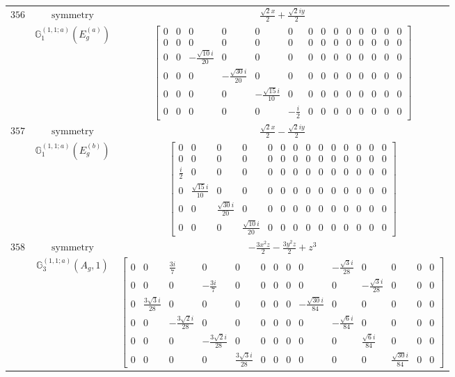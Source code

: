 \documentclass[fleqn,8pt,landscape]{jsarticle}
\begin{document}
\begin{longtable}{ccc}
$ 356 $ & $ \text{symmetry} $ & $ \frac{\sqrt{2} x}{2} + \frac{\sqrt{2} i y}{2} $ \\
$  $ & $ \mathbb{G}_{1}^{(1,1;a)}(E_{g}^{(a)}) $ & $ \begin{bmatrix} 0 & 0 & 0 & 0 & 0 & 0 & 0 & 0 & 0 & 0 & 0 & 0 & 0 & 0 \\ 0 & 0 & 0 & 0 & 0 & 0 & 0 & 0 & 0 & 0 & 0 & 0 & 0 & 0 \\ 0 & 0 & - \frac{\sqrt{10} i}{20} & 0 & 0 & 0 & 0 & 0 & 0 & 0 & 0 & 0 & 0 & 0 \\ 0 & 0 & 0 & - \frac{\sqrt{30} i}{20} & 0 & 0 & 0 & 0 & 0 & 0 & 0 & 0 & 0 & 0 \\ 0 & 0 & 0 & 0 & - \frac{\sqrt{15} i}{10} & 0 & 0 & 0 & 0 & 0 & 0 & 0 & 0 & 0 \\ 0 & 0 & 0 & 0 & 0 & - \frac{i}{2} & 0 & 0 & 0 & 0 & 0 & 0 & 0 & 0 \end{bmatrix} $ \\ \hline
$ 357 $ & $ \text{symmetry} $ & $ \frac{\sqrt{2} x}{2} - \frac{\sqrt{2} i y}{2} $ \\
$  $ & $ \mathbb{G}_{1}^{(1,1;a)}(E_{g}^{(b)}) $ & $ \begin{bmatrix} 0 & 0 & 0 & 0 & 0 & 0 & 0 & 0 & 0 & 0 & 0 & 0 & 0 & 0 \\ 0 & 0 & 0 & 0 & 0 & 0 & 0 & 0 & 0 & 0 & 0 & 0 & 0 & 0 \\ \frac{i}{2} & 0 & 0 & 0 & 0 & 0 & 0 & 0 & 0 & 0 & 0 & 0 & 0 & 0 \\ 0 & \frac{\sqrt{15} i}{10} & 0 & 0 & 0 & 0 & 0 & 0 & 0 & 0 & 0 & 0 & 0 & 0 \\ 0 & 0 & \frac{\sqrt{30} i}{20} & 0 & 0 & 0 & 0 & 0 & 0 & 0 & 0 & 0 & 0 & 0 \\ 0 & 0 & 0 & \frac{\sqrt{10} i}{20} & 0 & 0 & 0 & 0 & 0 & 0 & 0 & 0 & 0 & 0 \end{bmatrix} $ \\ \hline
$ 358 $ & $ \text{symmetry} $ & $ - \frac{3 x^{2} z}{2} - \frac{3 y^{2} z}{2} + z^{3} $ \\
$  $ & $ \mathbb{G}_{3}^{(1,1;a)}(A_{g},1) $ & $ \begin{bmatrix} 0 & 0 & \frac{3 i}{7} & 0 & 0 & 0 & 0 & 0 & 0 & - \frac{\sqrt{3} i}{28} & 0 & 0 & 0 & 0 \\ 0 & 0 & 0 & - \frac{3 i}{7} & 0 & 0 & 0 & 0 & 0 & 0 & - \frac{\sqrt{3} i}{28} & 0 & 0 & 0 \\ 0 & \frac{3 \sqrt{3} i}{28} & 0 & 0 & 0 & 0 & 0 & 0 & - \frac{\sqrt{30} i}{84} & 0 & 0 & 0 & 0 & 0 \\ 0 & 0 & - \frac{3 \sqrt{2} i}{28} & 0 & 0 & 0 & 0 & 0 & 0 & - \frac{\sqrt{6} i}{84} & 0 & 0 & 0 & 0 \\ 0 & 0 & 0 & - \frac{3 \sqrt{2} i}{28} & 0 & 0 & 0 & 0 & 0 & 0 & \frac{\sqrt{6} i}{84} & 0 & 0 & 0 \\ 0 & 0 & 0 & 0 & \frac{3 \sqrt{3} i}{28} & 0 & 0 & 0 & 0 & 0 & 0 & \frac{\sqrt{30} i}{84} & 0 & 0 \end{bmatrix} $ \\ \hline

\end{longtable}
\end{document}
